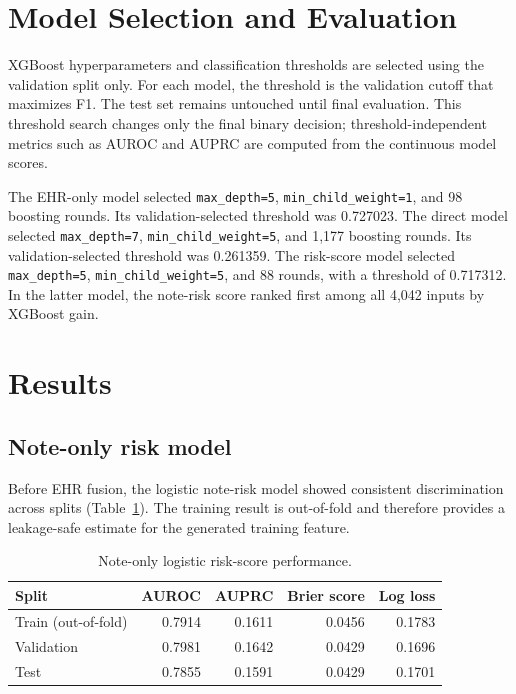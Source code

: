 \documentclass[11pt]{article}
\begin{document}
\section{Model Selection and Evaluation}

XGBoost hyperparameters and classification thresholds are selected using the
validation split only. For each model, the threshold is the validation cutoff
that maximizes F1. The test set remains untouched until final evaluation. This
threshold search changes only the final binary decision; threshold-independent
metrics such as AUROC and AUPRC are computed from the continuous model scores.

The EHR-only model selected \texttt{max\_depth=5},
\texttt{min\_child\_weight=1}, and 98 boosting rounds. Its
validation-selected threshold was 0.727023. The direct model selected
\texttt{max\_depth=7},
\texttt{min\_child\_weight=5}, and 1,177 boosting rounds. Its validation-selected
threshold was 0.261359. The risk-score model selected
\texttt{max\_depth=5}, \texttt{min\_child\_weight=5}, and 88 rounds, with a
threshold of 0.717312. In the latter model, the note-risk score ranked first among
all 4,042 inputs by XGBoost gain.

\section{Results}

\subsection{Note-only risk model}

Before EHR fusion, the logistic note-risk model showed consistent discrimination
across splits (Table~\ref{tab:note-risk}). The training result is out-of-fold and
therefore provides a leakage-safe estimate for the generated training feature.

\begin{table}[ht]
\centering
\caption{Note-only logistic risk-score performance.}
\label{tab:note-risk}
\begin{tabular}{lrrrr}
\toprule
\rowcolor{lightblue}
Split & AUROC & AUPRC & Brier score & Log loss \\
\midrule
Train (out-of-fold) & 0.7914 & 0.1611 & 0.0456 & 0.1783 \\
Validation          & 0.7981 & 0.1642 & 0.0429 & 0.1696 \\
Test                & 0.7855 & 0.1591 & 0.0429 & 0.1701 \\
\bottomrule
\end{tabular}
\end{table}
\end{document}
